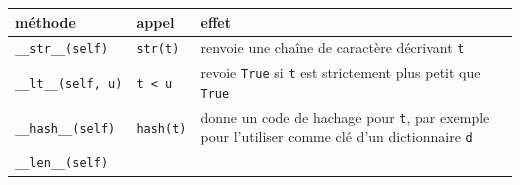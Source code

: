 \documentclass[a4paper,17pt]{extarticle}
\begin{document}
\begin{longtable}[]{@{}lll@{}}
\toprule
\begin{minipage}[b]{0.30\columnwidth}\raggedright
méthode\strut
\end{minipage} & \begin{minipage}[b]{0.30\columnwidth}\raggedright
appel\strut
\end{minipage} & \begin{minipage}[b]{0.30\columnwidth}\raggedright
effet\strut
\end{minipage}\tabularnewline
\midrule
\endhead
\begin{minipage}[t]{0.30\columnwidth}\raggedright
\texttt{\_\_str\_\_(self)}\strut
\end{minipage} & \begin{minipage}[t]{0.30\columnwidth}\raggedright
\texttt{str(t)}\strut
\end{minipage} & \begin{minipage}[t]{0.30\columnwidth}\raggedright
renvoie une chaîne de caractère décrivant \texttt{t}\strut
\end{minipage}\tabularnewline
\begin{minipage}[t]{0.30\columnwidth}\raggedright
\texttt{\_\_lt\_\_(self,\ u)}\strut
\end{minipage} & \begin{minipage}[t]{0.30\columnwidth}\raggedright
\texttt{t\ \textless{}\ u}\strut
\end{minipage} & \begin{minipage}[t]{0.30\columnwidth}\raggedright
revoie \texttt{True} si \texttt{t} est strictement plus petit que
\texttt{True}\strut
\end{minipage}\tabularnewline
\begin{minipage}[t]{0.30\columnwidth}\raggedright
\texttt{\_\_hash\_\_(self)}\strut
\end{minipage} & \begin{minipage}[t]{0.30\columnwidth}\raggedright
\texttt{hash(t)}\strut
\end{minipage} & \begin{minipage}[t]{0.30\columnwidth}\raggedright
donne un code de hachage pour \texttt{t}, par exemple pour l'utiliser
comme clé d'un dictionnaire \texttt{d}\strut
\end{minipage}\tabularnewline
\begin{minipage}[t]{0.30\columnwidth}\raggedright
\texttt{\_\_len\_\_(self)}\strut
\end{minipage} & \begin{minipage}[t]{0.30\columnwidth}\raggedright

\end{minipage}
\end{longtable}
\end{document}
